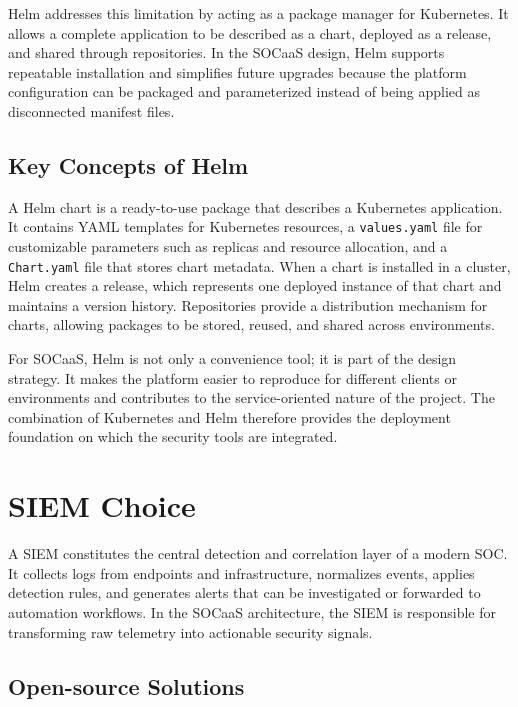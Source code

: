 Helm addresses this limitation by acting as a package manager for Kubernetes. It allows a complete application to be described as a chart, deployed as a release, and shared through repositories. In the SOCaaS design, Helm supports repeatable installation and simplifies future upgrades because the platform configuration can be packaged and parameterized instead of being applied as disconnected manifest files.

\subsection{Key Concepts of Helm}
\label{subsec:helm-concepts}

A Helm chart is a ready-to-use package that describes a Kubernetes application. It contains YAML templates for Kubernetes resources, a \texttt{values.yaml} file for customizable parameters such as replicas and resource allocation, and a \texttt{Chart.yaml} file that stores chart metadata. When a chart is installed in a cluster, Helm creates a release, which represents one deployed instance of that chart and maintains a version history. Repositories provide a distribution mechanism for charts, allowing packages to be stored, reused, and shared across environments.

For SOCaaS, Helm is not only a convenience tool; it is part of the design strategy. It makes the platform easier to reproduce for different clients or environments and contributes to the service-oriented nature of the project. The combination of Kubernetes and Helm therefore provides the deployment foundation on which the security tools are integrated.

\section{SIEM Choice}
\label{sec:siem}

A SIEM constitutes the central detection and correlation layer of a modern SOC. It collects logs from endpoints and infrastructure, normalizes events, applies detection rules, and generates alerts that can be investigated or forwarded to automation workflows. In the SOCaaS architecture, the SIEM is responsible for transforming raw telemetry into actionable security signals.

\subsection{Open-source Solutions}
\label{subsec:siem-open}

